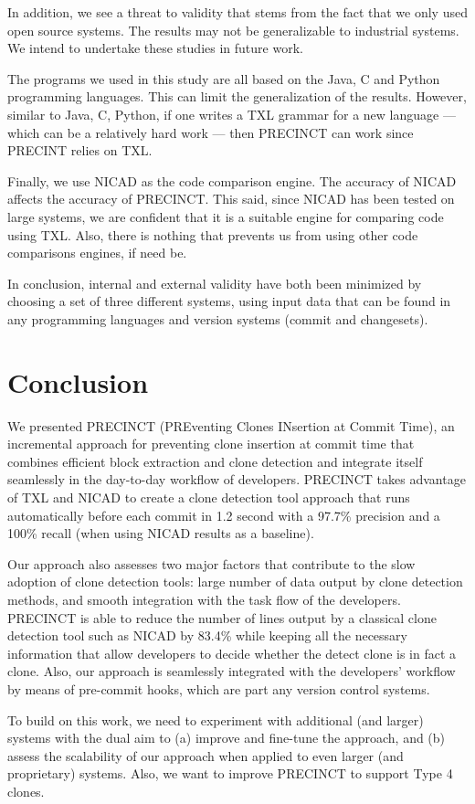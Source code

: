 \documentclass[conference]{IEEEtran}
\begin{document}
In addition, we see a threat to validity that stems from the fact that we only used open source systems. The results may not be generalizable to industrial systems. We intend to undertake these studies in future work.

The programs we used in this study are all based on the Java, C and Python programming languages. This can limit the generalization of the results. However, similar to Java, C, Python, if one writes a TXL grammar for a new language --- which can be a relatively hard work --- then PRECINCT can work since PRECINT relies on TXL.

Finally, we use NICAD as the code comparison engine. The accuracy of NICAD affects the accuracy of PRECINCT. This said, since NICAD has been tested on large systems, we are confident that it is a suitable engine for comparing code using TXL. Also, there is nothing that prevents us from using other code comparisons engines, if need be.

In conclusion, internal and external validity have both been minimized by choosing a set of three different systems, using input data that can be found in any programming languages and version systems (commit and changesets).



\section{Conclusion}
\label{sec:Conclusion}

We presented PRECINCT (PREventing Clones INsertion at Commit Time), an incremental approach for preventing clone insertion at commit time that combines efficient block extraction and clone detection and integrate itself seamlessly in the day-to-day workflow of developers.
PRECINCT takes advantage of TXL and NICAD to create a clone detection tool approach that runs automatically before each commit in 1.2 second with a 97.7\% precision and a 100\% recall (when using NICAD results as a baseline).

Our approach also assesses two major factors that contribute to the slow adoption of clone detection tools: large number of data output by clone detection methods,  and  smooth integration with the task flow of the developers.
PRECINCT is able to reduce the number of lines output by a classical clone detection tool such as NICAD by 83.4\% while keeping all the necessary information that allow developers to decide whether the detect clone is in fact a clone.
Also, our approach is seamlessly integrated with the developers' workflow by means of pre-commit hooks, which are part any version control systems.

To build on this work, we need to experiment with additional (and larger) systems with the dual aim to (a) improve and fine-tune the approach, and (b) assess the scalability of our approach when applied to even larger (and proprietary) systems. Also, we want to improve PRECINCT to support Type 4 clones.




\end{document}
